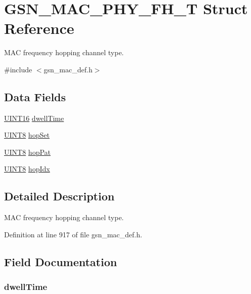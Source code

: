 \hypertarget{a00120}{
\section{GSN\_\-MAC\_\-PHY\_\-FH\_\-T Struct Reference}
\label{a00120}
}


MAC frequency hopping channel type.  




{\ttfamily \#include $<$gsn\_\-mac\_\-def.h$>$}

\subsection*{Data Fields}
\begin{DoxyCompactItemize}
\item 
\hyperlink{a00660_ga09f1a1fb2293e33483cc8d44aefb1eb1}{UINT16} \hyperlink{a00120_a4a9f50f43fc7bf02894d9c24c1f40bd2}{dwellTime}
\item 
\hyperlink{a00660_gab27e9918b538ce9d8ca692479b375b6a}{UINT8} \hyperlink{a00120_ac3a5dec5476623532501f5dfb5bda3aa}{hopSet}
\item 
\hyperlink{a00660_gab27e9918b538ce9d8ca692479b375b6a}{UINT8} \hyperlink{a00120_ad65126d514273f7ccbc531bc1a702fe5}{hopPat}
\item 
\hyperlink{a00660_gab27e9918b538ce9d8ca692479b375b6a}{UINT8} \hyperlink{a00120_aa07d34eeb025eb5e4aba050a623bc569}{hopIdx}
\end{DoxyCompactItemize}


\subsection{Detailed Description}
MAC frequency hopping channel type. 

Definition at line 917 of file gsn\_\-mac\_\-def.h.



\subsection{Field Documentation}
\hypertarget{a00120_a4a9f50f43fc7bf02894d9c24c1f40bd2}{
\subsubsection[{dwellTime}]{ {\bf dwellTime}}}
\label{a00120_a4a9f50f43fc7bf02894d9c24c1f40bd2}


